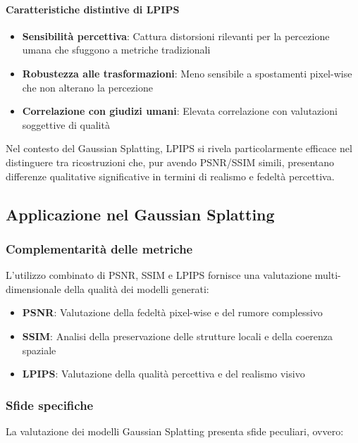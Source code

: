 \paragraph{Caratteristiche distintive di LPIPS}
\begin{itemize}
	\item \textbf{Sensibilità percettiva}: Cattura distorsioni rilevanti per la percezione umana che sfuggono a metriche tradizionali
	\item \textbf{Robustezza alle trasformazioni}: Meno sensibile a spostamenti pixel-wise che non alterano la percezione
	\item \textbf{Correlazione con giudizi umani}: Elevata correlazione con valutazioni soggettive di qualità
\end{itemize}

Nel contesto del Gaussian Splatting, LPIPS si rivela particolarmente efficace nel distinguere tra ricostruzioni che, pur avendo PSNR/SSIM simili, presentano differenze qualitative significative in termini di realismo e fedeltà percettiva.

\subsection{Applicazione nel Gaussian Splatting}

\subsubsection{Complementarità delle metriche}

L'utilizzo combinato di PSNR, SSIM e LPIPS fornisce una valutazione multi-dimensionale della qualità dei modelli generati:

\begin{itemize}
	\item \textbf{PSNR}: Valutazione della fedeltà pixel-wise e del rumore complessivo
	\item \textbf{SSIM}: Analisi della preservazione delle strutture locali e della coerenza spaziale  
	\item \textbf{LPIPS}: Valutazione della qualità percettiva e del realismo visivo
\end{itemize}

\subsubsection{Sfide specifiche}

La valutazione dei modelli Gaussian Splatting presenta sfide peculiari, ovvero:

